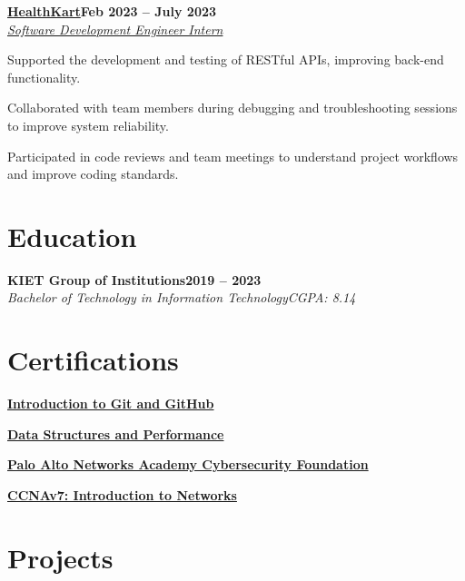 \documentclass[letterpaper,10pt]{article}
\newcommand{\heading}[2]{
  \hspace{10pt}#1\hfill#2\\
}
\newcommand{\headingBf}[2]{
  \heading{\textbf{#1}}{\textbf{#2}}
}
\newcommand{\headingIt}[2]{
  \heading{\textit{#1}}{\textit{#2}}
}
\newenvironment{resume_list}{
  \vspace{-7pt}
  \begin{itemize}[itemsep=-2px, parsep=1pt, leftmargin=30pt]
}{
  \end{itemize}
}
\begin{document}
\headingBf{\href{https://www.healthcart.com}{HealthKart}}{Feb 2023 -- July 2023} 
\headingIt{\href {https://drive.google.com/file/d/1Iz83NKtrG7A1KG_rK0P8s_sAquzRm_OY/view?usp=sharing}{Software Development Engineer Intern}}{}
\begin{resume_list}
  \item Supported the development and testing of RESTful APIs, improving back-end functionality.
  \item Collaborated with team members during debugging and troubleshooting sessions to improve system reliability.  
  \item Participated in code reviews and team meetings to understand project workflows and improve coding standards.  
\end{resume_list}

\section{Education}

\headingBf{KIET Group of Institutions}{2019 -- 2023}
\headingIt{Bachelor of Technology in Information Technology}{CGPA: 8.14}

\section{Certifications}
\begin{resume_list}  

\item \headingBf{\href {https://www.coursera.org/account/accomplishments/verify/VAXY9EEWXD3C}{Introduction to Git and GitHub}}{}

\item \headingBf{\href {https://www.coursera.org/account/accomplishments/verify/MEHYBBVAYE8E}{Data Structures and Performance}}{}

\item \headingBf{\href {https://www.coursera.org/account/accomplishments/verify/R73VUS4L44RN}{Palo Alto Networks Academy Cybersecurity Foundation}}{}

\item \headingBf{\href {https://drive.google.com/file/d/15n4G1_3d75gbxfikhzodotRZVXInxqhJ/view?usp=sharing}{CCNAv7: Introduction to Networks}}{}
\end{resume_list}

\section{Projects}
\end{document}
